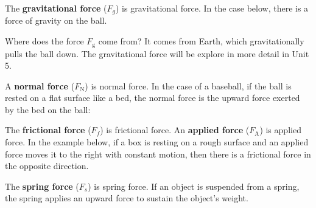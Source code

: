 \documentclass[dvipsnames]{article}
\begin{document}
The \textbf{\gls{gravitational force}} ($F_g$) is \glsdesc{gravitational force}. In the case below, there is a force of gravity on the ball. 

\begin{center}
\end{center}

Where does the force $F_\mathrm{g}$ come from? It comes from Earth, which gravitationally pulls the ball down. The gravitational force will be explore in more detail in Unit 5.

A \textbf{\gls{normal force}} ($F_\text{N}$) is \glsdesc{normal force}. In the case of a baseball, if the ball is rested on a flat surface like a bed, the normal force is the upward force exerted by the bed on the ball:

\begin{center}
\end{center}


The \textbf{\gls{frictional force}} ($F_f$) is \glsdesc{frictional force}. An \textbf{\gls{applied force}} ($F_\mathrm{A}$) is \glsdesc{applied force}. In the example below, if a box is resting on a rough surface and an applied force moves it to the right with constant motion, then there is a frictional force in the opposite direction.

\begin{center}
\end{center}

The \textbf{\gls{spring force}} ($F_s$) is \glsdesc{spring force}. If an object is suspended from a spring, the spring applies an upward force to sustain the object's weight.
\end{document}
